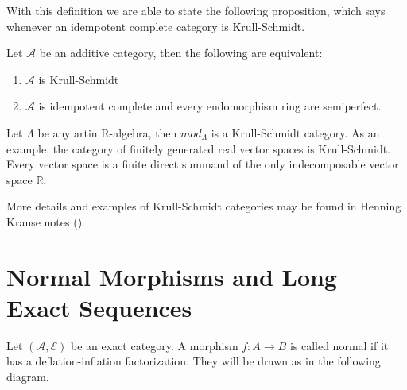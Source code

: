     With this definition we are able to state the following proposition, which says whenever an idempotent complete category is Krull-Schmidt.

    \begin{prop}
        Let $\mathcal{A}$ be an additive category, then the following are equivalent:
        \begin{enumerate}
            \item $\mathcal{A}$ is Krull-Schmidt
            \item $\mathcal{A}$ is idempotent complete and every endomorphism ring are semiperfect.
        \end{enumerate}
    \end{prop}




    \begin{example}
        Let $\Lambda$ be any artin R-algebra, then $mod_{\Lambda}$ is a Krull-Schmidt category. As an example, the category of finitely generated real vector spaces is Krull-Schmidt. Every vector space is a finite direct summand of the only indecomposable vector space $\mathbb{R}$.
    \end{example}

    More details and examples of Krull-Schmidt categories may be found in Henning Krause notes (\cite{Kra12}).

\section{Normal Morphisms and Long Exact Sequences}
    
    \begin{definition}
        Let $(\mathcal{A},\mathcal{E})$ be an exact category. A morphism $f:A\rightarrow B$ is called normal if it has a deflation-inflation factorization. They will be drawn as in the following diagram.
        \begin{center}
        \end{center}
    \end{definition}

